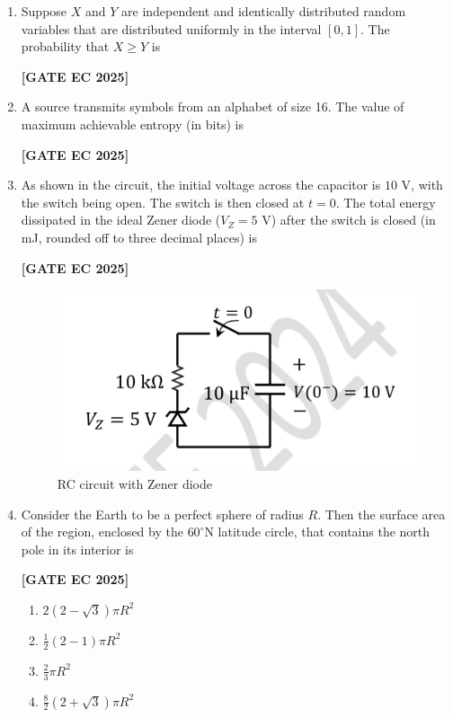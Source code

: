 \documentclass[12pt]{article}
\begin{document}
\begin{enumerate}[leftmargin=1.5em, label=\textbf{Q.\arabic*}., itemsep=2em]
\item Suppose $X$ and $Y$ are independent and identically distributed random variables that are distributed uniformly in the interval $[0,1]$. The probability that $X \geq Y$ is

\noindent \textbf{[GATE EC 2025]}

\item A source transmits symbols from an alphabet of size 16. The value of maximum achievable entropy (in bits) is

\noindent \textbf{[GATE EC 2025]}

\item As shown in the circuit, the initial voltage across the capacitor is $10$ V, with the switch being open. The switch is then closed at $t=0$. The total energy dissipated in the ideal Zener diode ($V_Z = 5$ V) after the switch is closed (in mJ, rounded off to three decimal places) is

\noindent \textbf{[GATE EC 2025]}
\begin{figure}[H]\centering
\includegraphics[width=0.65\columnwidth]{figs/q35.png}
\caption{RC circuit with Zener diode}
\label{fig:q35}
\end{figure}

\item Consider the Earth to be a perfect sphere of radius $R$. Then the surface area of the region, enclosed by the $60^\circ$N latitude circle, that contains the north pole in its interior is

\noindent \textbf{[GATE EC 2025]}
\begin{multicols}{2}
\begin{enumerate}
    \item $2(2-\sqrt{3})\pi R^2$
    \item $\tfrac{1}{2}(2-1)\pi R^2$
    \item $\tfrac{2}{3}\pi R^2$
    \item $\tfrac{8}{2}(2+\sqrt{3})\pi R^2$
\end{enumerate}
\end{multicols}


\end{enumerate}
\end{document}

